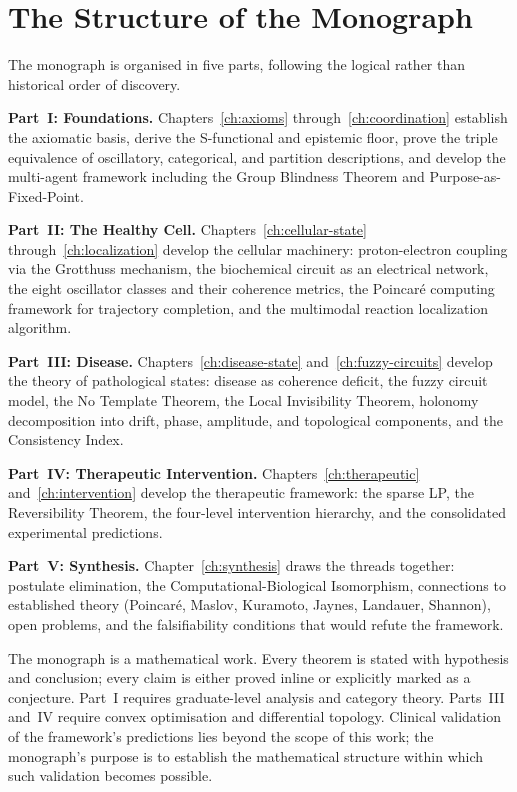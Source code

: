 \section*{The Structure of the Monograph}

The monograph is organised in five parts, following the logical rather
than historical order of discovery.

\textbf{Part~I: Foundations.}  Chapters~\ref{ch:axioms}
through~\ref{ch:coordination} establish the axiomatic basis, derive the
S-functional and epistemic floor, prove the triple equivalence of
oscillatory, categorical, and partition descriptions, and develop the
multi-agent framework including the Group Blindness Theorem and
Purpose-as-Fixed-Point.

\textbf{Part~II: The Healthy Cell.}
Chapters~\ref{ch:cellular-state} through~\ref{ch:localization} develop
the cellular machinery: proton-electron coupling via the Grotthuss
mechanism, the biochemical circuit as an electrical network, the eight
oscillator classes and their coherence metrics, the Poincaré computing
framework for trajectory completion, and the multimodal reaction
localization algorithm.

\textbf{Part~III: Disease.}
Chapters~\ref{ch:disease-state} and~\ref{ch:fuzzy-circuits} develop the
theory of pathological states: disease as coherence deficit, the fuzzy
circuit model, the No Template Theorem, the Local Invisibility Theorem,
holonomy decomposition into drift, phase, amplitude, and topological
components, and the Consistency Index.

\textbf{Part~IV: Therapeutic Intervention.}
Chapters~\ref{ch:therapeutic} and~\ref{ch:intervention} develop the
therapeutic framework: the sparse LP, the Reversibility Theorem, the
four-level intervention hierarchy, and the consolidated experimental
predictions.

\textbf{Part~V: Synthesis.}
Chapter~\ref{ch:synthesis} draws the threads together: postulate
elimination, the Computational-Biological Isomorphism, connections to
established theory (Poincaré, Maslov, Kuramoto, Jaynes, Landauer,
Shannon), open problems, and the falsifiability conditions that would
refute the framework.

\medskip

The monograph is a mathematical work.  Every theorem is stated with
hypothesis and conclusion; every claim is either proved inline or
explicitly marked as a conjecture.  Part~I requires graduate-level
analysis and category theory.  Parts~III and~IV require convex
optimisation and differential topology.  Clinical validation of the
framework's predictions lies beyond the scope of this work; the
monograph's purpose is to establish the mathematical structure within
which such validation becomes possible.

